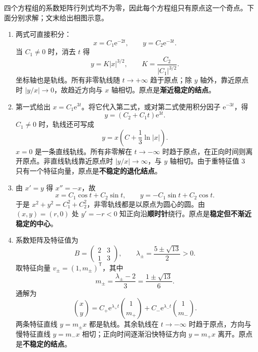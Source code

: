 \documentclass[UTF8,a4paper,11pt]{ctexart}
\newcommand{\e}{\mathrm e}
\begin{document}
\begin{solution}
四个方程组的系数矩阵行列式均不为零，因此每个方程组只有原点这一个奇点。下面分别求解；文末给出相图示意。
\begin{enumerate}[label=(\arabic*)]
\item 两式可直接积分：
\[
x=C_1\e^{-2t},\qquad y=C_2\e^{-3t}.
\]
当 $C_1\ne0$ 时，消去 $t$ 得
\[
y=K|x|^{3/2},\qquad K=\frac{C_2}{|C_1|^{3/2}}.
\]
坐标轴也是轨线。所有非零轨线随 $t\to+\infty$ 趋于原点；除 $y$ 轴外，靠近原点时 $|y/x|\to0$，故趋近方向与 $x$ 轴相切。原点是\textbf{渐近稳定的结点}。

\item 第一式给出 $x=C_1\e^{3t}$。将它代入第二式，或对第二式使用积分因子 $\e^{-3t}$，得
\[
y=(C_2+C_1t)\e^{3t}.
\]
$C_1\ne0$ 时，轨线还可写成
\[
y=x\left(C+\frac13\ln|x|\right).
\]
$x=0$ 是一条直线轨线。所有非零解在 $t\to-\infty$ 时趋于原点，在正向时间则离开原点。非直线轨线靠近原点时 $|y/x|\to\infty$，与 $y$ 轴相切。由于重特征值 $3$ 只有一个特征向量，原点是\textbf{不稳定的退化结点}。

\item 由 $x'=y$ 得 $x''=-x$，故
\[
x=C_1\cos t+C_2\sin t,\qquad
y=-C_1\sin t+C_2\cos t.
\]
于是 $x^2+y^2=C_1^2+C_2^2$，非零轨线都是以原点为圆心的圆。由 $(x,y)=(r,0)$ 处 $y'=-r<0$ 知正向沿\textbf{顺时针}绕行。原点是\textbf{稳定但不渐近稳定的中心}。

\item 系数矩阵及特征值为
\[
B=\begin{pmatrix}2&3\\1&3\end{pmatrix},\qquad
\lambda_\pm=\frac{5\pm\sqrt{13}}2>0.
\]
取特征向量 $v_\pm=(1,m_\pm)^{\mathsf T}$，其中
\[
m_\pm=\frac{\lambda_\pm-2}{3}
=\frac{1\pm\sqrt{13}}6.
\]
通解为
\[
\binom{x}{y}
=C_+\e^{\lambda_+t}\binom{1}{m_+}
 +C_-\e^{\lambda_-t}\binom{1}{m_-}.
\]
两条特征直线 $y=m_\pm x$ 都是轨线。其余轨线在 $t\to-\infty$ 时趋于原点，方向与慢特征直线 $y=m_-x$ 相切；正向时间逐渐沿快特征方向 $y=m_+x$ 离开。原点是\textbf{不稳定的结点}。
\end{enumerate}


\end{solution}
\end{document}
